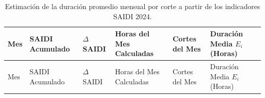 \documentclass[
  spanish,
  letterpaper,
  DIV=11,
  numbers=noendperiod]{scrreprt}
\theoremstyle{plain}
\theoremstyle{definition}
\theoremstyle{remark}
\begin{document}
\begin{longtable}[]{@{}
  >{\raggedright\arraybackslash}p{}
  >{\centering\arraybackslash}p{}
  >{\centering\arraybackslash}p{}
  >{\centering\arraybackslash}p{}
  >{\centering\arraybackslash}p{}
  >{\centering\arraybackslash}p{}@{}}
\caption{Estimación de la duración promedio mensual por corte a partir
de los indicadores SAIDI
2024.}\label{tbl-duracion-cortes}\tabularnewline
\toprule\noalign{}
\begin{minipage}[b]{\linewidth}\raggedright
Mes
\end{minipage} & \begin{minipage}[b]{\linewidth}\centering
SAIDI Acumulado
\end{minipage} & \begin{minipage}[b]{\linewidth}\centering
\(\Delta\) SAIDI
\end{minipage} & \begin{minipage}[b]{\linewidth}\centering
Horas del Mes Calculadas
\end{minipage} & \begin{minipage}[b]{\linewidth}\centering
Cortes del Mes
\end{minipage} & \begin{minipage}[b]{\linewidth}\centering
Duración Media \(E_i\) (Horas)
\end{minipage} \\
\midrule\noalign{}
\endfirsthead
\toprule\noalign{}
\begin{minipage}[b]{\linewidth}\raggedright
Mes
\end{minipage} & \begin{minipage}[b]{\linewidth}\centering
SAIDI Acumulado
\end{minipage} & \begin{minipage}[b]{\linewidth}\centering
\(\Delta\) SAIDI
\end{minipage} & \begin{minipage}[b]{\linewidth}\centering
Horas del Mes Calculadas
\end{minipage} & \begin{minipage}[b]{\linewidth}\centering
Cortes del Mes
\end{minipage} & \begin{minipage}[b]{\linewidth}\centering
Duración Media \(E_i\) (Horas)

\end{minipage}
\end{longtable}
\end{document}
